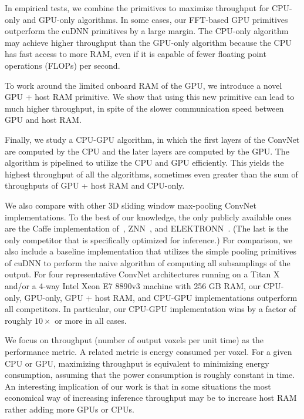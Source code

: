 \documentclass[conference]{./IEEEtran}
\begin{document}
  In empirical tests, we combine the primitives to maximize throughput
  for CPU-only and GPU-only algorithms. In some cases, our FFT-based
  GPU primitives outperform the cuDNN primitives by a large margin.
  The CPU-only algorithm may achieve higher throughput than the
  GPU-only algorithm because the CPU has fast access to more RAM, even
  if it is capable of fewer floating point operations (FLOPs) per
  second.

  To work around the limited onboard RAM of the GPU, we introduce a
  novel GPU + host RAM primitive.  We show that using this new
  primitive can lead to much higher throughput, in spite of the slower
  communication speed between GPU and host RAM.

  Finally, we study a CPU-GPU algorithm, in which the first layers of
  the ConvNet are computed by the CPU and the later layers are
  computed by the GPU.  The algorithm is pipelined to utilize the CPU
  and GPU efficiently.  This yields the highest throughput of all the
  algorithms, sometimes even greater than the sum of throughputs of
  GPU + host RAM and CPU-only.

  We also compare with other 3D sliding window max-pooling ConvNet
  implementations.  To the best of our knowledge, the only publicly
  available ones are the Caffe implementation
  of~\cite{tschopp2015efficient}, ZNN~\cite{zlateski2015znn}, and
  ELEKTRONN~\cite{ELEKTRONN2015}.  (The last is the only competitor
  that is specifically optimized for inference.) For comparison, we
  also include a baseline implementation that utilizes the simple
  pooling primitives of cuDNN to perform the naive algorithm of
  computing all subsamplings of the output.  For four representative
  ConvNet architectures running on a Titan X and/or a 4-way Intel Xeon
  E7 8890v3 machine with 256 GB RAM, our CPU-only, GPU-only, GPU +
  host RAM, and CPU-GPU implementations outperform all competitors.
  In particular, our CPU-GPU implementation wins by a factor of
  roughly $10\times$ or more in all cases.

  We focus on throughput (number of output voxels per unit time) as
  the performance metric.  A related metric is energy consumed per
  voxel.  For a given CPU or GPU, maximizing throughput is equivalent
  to minimizing energy consumption, assuming that the power
  consumption is roughly constant in time.  An interesting implication
  of our work is that in some situations the most economical way of
  increasing inference throughput may be to increase host RAM rather
  adding more GPUs or CPUs.
\end{document}
